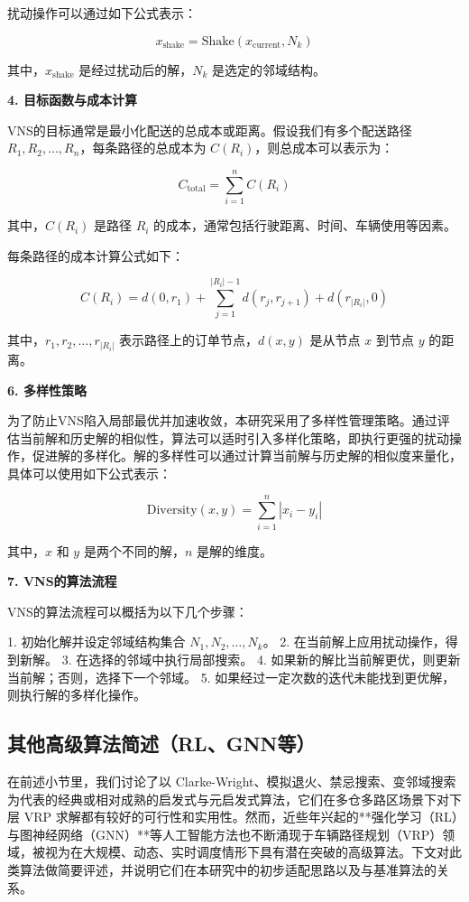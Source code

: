 \documentclass[12pt,a4paper,twoside]{ctexbook}
\begin{document}
扰动操作可以通过如下公式表示：

\[
x_{\text{shake}} = \text{Shake}(x_{\text{current}}, N_k)
\]

其中，$x_{\text{shake}}$ 是经过扰动后的解，$N_k$ 是选定的邻域结构。

\textbf{4. 目标函数与成本计算}

VNS的目标通常是最小化配送的总成本或距离。假设我们有多个配送路径 $R_1, R_2, \dots, R_n$，每条路径的总成本为 $C(R_i)$，则总成本可以表示为：

\[
C_{\text{total}} = \sum_{i=1}^{n} C(R_i)
\]

其中，$C(R_i)$ 是路径 $R_i$ 的成本，通常包括行驶距离、时间、车辆使用等因素。

每条路径的成本计算公式如下：

\[
C(R_i) = d(0, r_1) + \sum_{j=1}^{|R_i|-1} d(r_j, r_{j+1}) + d(r_{|R_i|}, 0)
\]

其中，$r_1, r_2, \dots, r_{|R_i|}$ 表示路径上的订单节点，$d(x, y)$ 是从节点 $x$ 到节点 $y$ 的距离。


\textbf{6. 多样性策略}

为了防止VNS陷入局部最优并加速收敛，本研究采用了多样性管理策略。通过评估当前解和历史解的相似性，算法可以适时引入多样化策略，即执行更强的扰动操作，促进解的多样化。解的多样性可以通过计算当前解与历史解的相似度来量化，具体可以使用如下公式表示：

\[
\text{Diversity}(x, y) = \sum_{i=1}^{n} |x_i - y_i|
\]

其中，$x$ 和 $y$ 是两个不同的解，$n$ 是解的维度。

\textbf{7. VNS的算法流程}

VNS的算法流程可以概括为以下几个步骤：

1. 初始化解并设定邻域结构集合 $N_1, N_2, \dots, N_k$。
2. 在当前解上应用扰动操作，得到新解。
3. 在选择的邻域中执行局部搜索。
4. 如果新的解比当前解更优，则更新当前解；否则，选择下一个邻域。
5. 如果经过一定次数的迭代未能找到更优解，则执行解的多样化操作。

 \subsection{其他高级算法简述（RL、GNN等）}

在前述小节里，我们讨论了以 Clarke-Wright、模拟退火、禁忌搜索、变邻域搜索为代表的经典或相对成熟的启发式与元启发式算法，它们在多仓多路区场景下对下层 VRP 求解都有较好的可行性和实用性。然而，近些年兴起的**强化学习（RL）与图神经网络（GNN）**等人工智能方法也不断涌现于车辆路径规划（VRP）领域，被视为在大规模、动态、实时调度情形下具有潜在突破的高级算法。下文对此类算法做简要评述，并说明它们在本研究中的初步适配思路以及与基准算法的关系。
\end{document}
